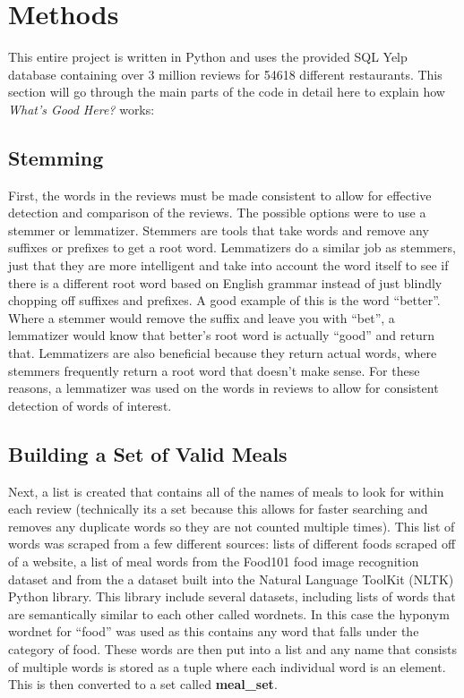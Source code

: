 \documentclass[12pt, openany]{scrbook}
\begin{document}
\chapter{Methods}

This entire project is written in Python and uses the provided SQL Yelp
database containing over 3 million reviews for 54618 different restaurants.
This section will go through the main parts of the code in detail here
to explain how \emph{What's Good Here?} works:

\section{Stemming}
First, the words in the reviews must be made consistent to allow for effective
detection and comparison of the reviews.
The possible options were to use a stemmer or lemmatizer.
Stemmers are tools that take words and remove any suffixes or prefixes to get a
root word. 
Lemmatizers do a similar job as stemmers, just that they are more intelligent and take into
account the word itself to see if there is a different root word based on
English grammar instead of just blindly chopping off suffixes and prefixes.
A good example of this is the word ``better''.
Where a stemmer would remove the suffix and leave you with ``bet'', a 
lemmatizer would know that better's root word is actually ``good'' and return that.
Lemmatizers are also beneficial because they return actual words, where stemmers
frequently return a root word that doesn't make sense.
For these reasons, a lemmatizer was used on the words in reviews to allow 
for consistent detection of words of interest.

\section{Building a Set of Valid Meals}
Next, a list is created that contains all of the names of meals to look for
within each review (technically its a set because this allows for faster 
searching and removes any duplicate words so they are not counted multiple times).
This list of words was scraped from a few different sources:
lists of different foods scraped off of a website\cite{vfg}, a list
of meal words from the Food101 food image recognition dataset and from
the a dataset built into the Natural Language ToolKit (NLTK) Python library.
This library include several datasets, including lists of words that are
semantically similar to each other called wordnets.
In this case the hyponym wordnet for ``food'' was used as this contains 
any word that falls under the category of food.
These words are then put into a list and any name that consists of
multiple words is stored as a tuple where each individual word is an element.
This is then converted to a set called \textbf{meal\_set}.
\end{document}

